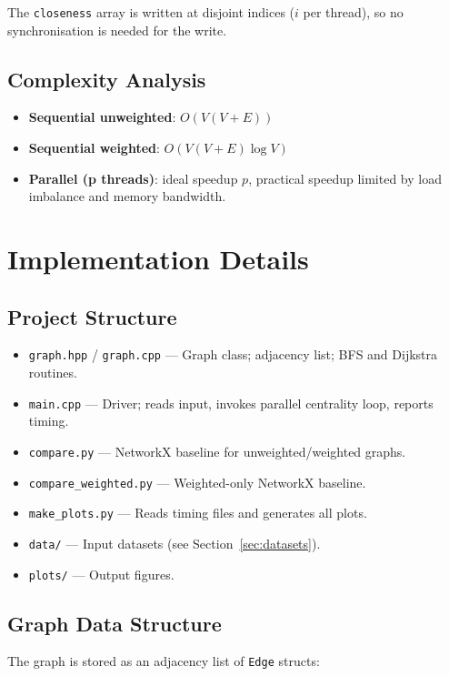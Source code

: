\documentclass[12pt,a4paper]{article}
\begin{document}
The \texttt{closeness} array is written at disjoint indices ($i$ per thread), so no
synchronisation is needed for the write.

\subsection{Complexity Analysis}
\begin{itemize}
  \item \textbf{Sequential unweighted}: $O(V(V+E))$
  \item \textbf{Sequential weighted}: $O(V(V+E)\log V)$
  \item \textbf{Parallel (p threads)}: ideal speedup $p$, practical speedup limited by
        load imbalance and memory bandwidth.
\end{itemize}

\section{Implementation Details}
\label{sec:impl}

\subsection{Project Structure}
\begin{itemize}
  \item \texttt{graph.hpp} / \texttt{graph.cpp} — Graph class; adjacency list; BFS and
        Dijkstra routines.
  \item \texttt{main.cpp} — Driver; reads input, invokes parallel centrality loop, reports
        timing.
  \item \texttt{compare.py} — NetworkX baseline for unweighted/weighted graphs.
  \item \texttt{compare\_weighted.py} — Weighted-only NetworkX baseline.
  \item \texttt{make\_plots.py} — Reads timing files and generates all plots.
  \item \texttt{data/} — Input datasets (see Section~\ref{sec:datasets}).
  \item \texttt{plots/} — Output figures.
\end{itemize}

\subsection{Graph Data Structure}
The graph is stored as an adjacency list of \texttt{Edge} structs:
\end{document}
